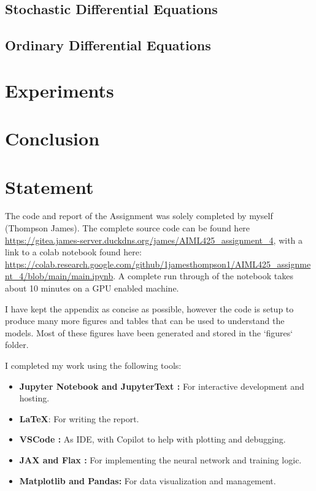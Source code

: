 \documentclass[conference,a4paper]{IEEEtran}
\begin{document}
\subsection{Stochastic Differential Equations}


\subsection{Ordinary Differential Equations}



\section{Experiments}


\section{Conclusion}


\newpage
\section*{Statement}

The code and report of the Assignment was solely completed by myself (Thompson James). The complete source code can be found here \url{https://gitea.james-server.duckdns.org/james/AIML425\_assignment\_4}, with a link to a colab notebook found here: \url{https://colab.research.google.com/github/1jamesthompson1/AIML425_assignment_4/blob/main/main.ipynb}. A complete run through of the notebook takes about 10 minutes on a GPU enabled machine.

I have kept the appendix as concise as possible, however the code is setup to produce many more figures and tables that can be used to understand the models. Most of these figures have been generated and stored in the `figures` folder.

I completed my work using the following tools:
\begin{itemize}
    \item \textbf{Jupyter Notebook \cite{Kluyver2016jupyter} and JupyterText \cite{woutsMwoutsJupytext2025}:} For interactive development and hosting.
    \item \textbf{\LaTeX}: For writing the report.
    \item \textbf{VSCode \cite{MicrosoftVscode2025}:} As IDE, with Copilot to help with plotting and debugging.
    \item \textbf{JAX \cite{jax2018github} and Flax \cite{flax2020github}:} For implementing the neural network and training logic.
    \item \textbf{Matplotlib\cite{Hunter:2007} and Pandas\cite{thepandasdevelopmentteamPandasdevPandasPandas}:} For data visualization and management.
\end{itemize}




\end{document}
